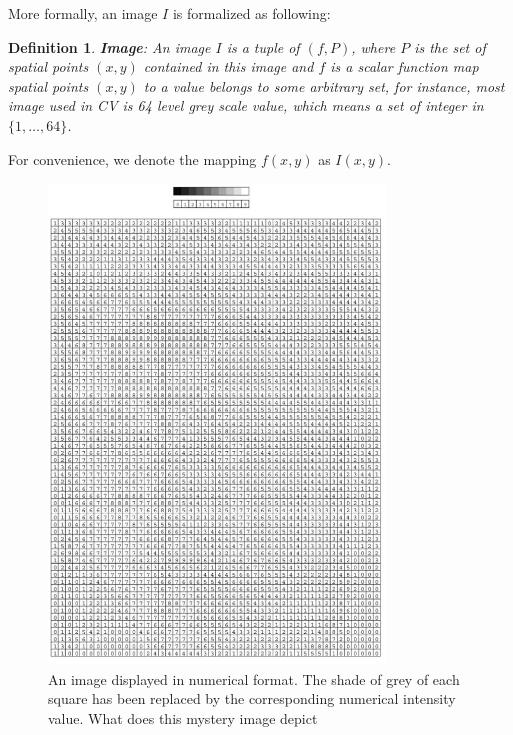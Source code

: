 \documentclass[a4paper]{book}
\newtheorem{definition}{Definition}[section]
\begin{document}
    More formally, an image $I$ is formalized as following:

    \begin{definition}
      \textbf{Image}: An image $I$ is a tuple of $(f, P)$, where $P$ is
      the set of spatial points $(x, y)$ contained in this image and $f$
      is a scalar function map spatial points $(x, y)$ to a value
      belongs to some arbitrary set, for instance, most image used in CV
      is 64 level grey scale value, which means a set of integer in $\{
      1, \ldots, 64\}$.
    \end{definition}

    For convenience, we denote the mapping $f(x, y)$ as $I(x, y)$.

    \begin{figure}[h]
      \begin{center}
        \includegraphics[width=0.8\textwidth]{./figures/numerical_image.PNG}
        \caption{An image displayed in numerical format. The shade of
          grey of each square has been replaced by the corresponding
          numerical intensity value. What does this mystery image
          depict\label{fig:numerical_image}}
      \end{center}
    \end{figure}
\end{document}
